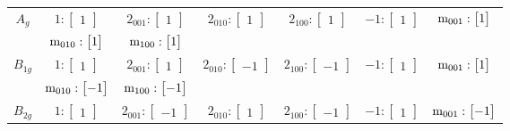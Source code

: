 \documentclass[fleqn,8pt,landscape]{jsarticle}
\begin{document}
\begin{longtable}{ccccccc}
$ A_{g} $ & $ 1:\begin{bmatrix} 1 \end{bmatrix} $ & $ 2{}_{001}:\begin{bmatrix} 1 \end{bmatrix} $ & $ 2{}_{010}:\begin{bmatrix} 1 \end{bmatrix} $ & $ 2{}_{100}:\begin{bmatrix} 1 \end{bmatrix} $ & $ -1:\begin{bmatrix} 1 \end{bmatrix} $ & $ {\rm m}_{001}:\begin{bmatrix} 1 \end{bmatrix} $ \\
& $ {\rm m}_{010}:\begin{bmatrix} 1 \end{bmatrix} $ & $ {\rm m}_{100}:\begin{bmatrix} 1 \end{bmatrix} $ & $  $ & $  $ & $  $ & $  $ \\ \hline
$ B_{1g} $ & $ 1:\begin{bmatrix} 1 \end{bmatrix} $ & $ 2{}_{001}:\begin{bmatrix} 1 \end{bmatrix} $ & $ 2{}_{010}:\begin{bmatrix} -1 \end{bmatrix} $ & $ 2{}_{100}:\begin{bmatrix} -1 \end{bmatrix} $ & $ -1:\begin{bmatrix} 1 \end{bmatrix} $ & $ {\rm m}_{001}:\begin{bmatrix} 1 \end{bmatrix} $ \\
& $ {\rm m}_{010}:\begin{bmatrix} -1 \end{bmatrix} $ & $ {\rm m}_{100}:\begin{bmatrix} -1 \end{bmatrix} $ & $  $ & $  $ & $  $ & $  $ \\ \hline
$ B_{2g} $ & $ 1:\begin{bmatrix} 1 \end{bmatrix} $ & $ 2{}_{001}:\begin{bmatrix} -1 \end{bmatrix} $ & $ 2{}_{010}:\begin{bmatrix} 1 \end{bmatrix} $ & $ 2{}_{100}:\begin{bmatrix} -1 \end{bmatrix} $ & $ -1:\begin{bmatrix} 1 \end{bmatrix} $ & $ {\rm m}_{001}:\begin{bmatrix} -1 \end{bmatrix} $ \\

\end{longtable}
\end{document}
